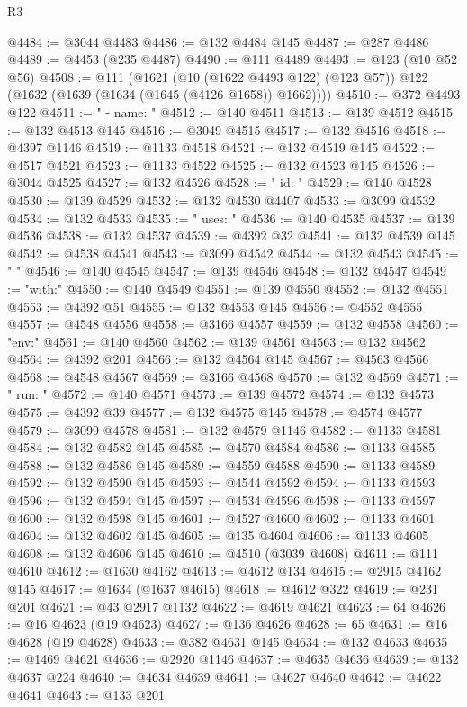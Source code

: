 \begin{lexlean}{R3}
\begin{coremodule}
@4484 := @3044 @4483
@4486 := @132 @4484 @145
@4487 := @287 @4486
@4489 := @4453 (@235 @4487)
@4490 := @111 @4489
@4493 := @123 (@10 @52 @56)
@4508 := @111
    (@1621
      (@10 (@1622 @4493 @122) (@123 @57))
      @122
      (@1632 (@1639 (@1634 (@1645 (@4126 @1658)) @1662))))
@4510 := @372 @4493 @122
@4511 := "      - name: "
@4512 := @140 @4511
@4513 := @139 @4512
@4515 := @132 @4513 @145
@4516 := @3049 @4515
@4517 := @132 @4516
@4518 := @4397 @1146
@4519 := @1133 @4518
@4521 := @132 @4519 @145
@4522 := @4517 @4521
@4523 := @1133 @4522
@4525 := @132 @4523 @145
@4526 := @3044 @4525
@4527 := @132 @4526
@4528 := "        id: "
@4529 := @140 @4528
@4530 := @139 @4529
@4532 := @132 @4530 @4407
@4533 := @3099 @4532
@4534 := @132 @4533
@4535 := "        uses: "
@4536 := @140 @4535
@4537 := @139 @4536
@4538 := @132 @4537
@4539 := @4392 @32
@4541 := @132 @4539 @145
@4542 := @4538 @4541
@4543 := @3099 @4542
@4544 := @132 @4543
@4545 := "        "
@4546 := @140 @4545
@4547 := @139 @4546
@4548 := @132 @4547
@4549 := "with:"
@4550 := @140 @4549
@4551 := @139 @4550
@4552 := @132 @4551
@4553 := @4392 @51
@4555 := @132 @4553 @145
@4556 := @4552 @4555
@4557 := @4548 @4556
@4558 := @3166 @4557
@4559 := @132 @4558
@4560 := "env:"
@4561 := @140 @4560
@4562 := @139 @4561
@4563 := @132 @4562
@4564 := @4392 @201
@4566 := @132 @4564 @145
@4567 := @4563 @4566
@4568 := @4548 @4567
@4569 := @3166 @4568
@4570 := @132 @4569
@4571 := "        run: "
@4572 := @140 @4571
@4573 := @139 @4572
@4574 := @132 @4573
@4575 := @4392 @39
@4577 := @132 @4575 @145
@4578 := @4574 @4577
@4579 := @3099 @4578
@4581 := @132 @4579 @1146
@4582 := @1133 @4581
@4584 := @132 @4582 @145
@4585 := @4570 @4584
@4586 := @1133 @4585
@4588 := @132 @4586 @145
@4589 := @4559 @4588
@4590 := @1133 @4589
@4592 := @132 @4590 @145
@4593 := @4544 @4592
@4594 := @1133 @4593
@4596 := @132 @4594 @145
@4597 := @4534 @4596
@4598 := @1133 @4597
@4600 := @132 @4598 @145
@4601 := @4527 @4600
@4602 := @1133 @4601
@4604 := @132 @4602 @145
@4605 := @135 @4604
@4606 := @1133 @4605
@4608 := @132 @4606 @145
@4610 := @4510 (@3039 @4608)
@4611 := @111 @4610
@4612 := @1630 @4162
@4613 := @4612 @134
@4615 := @2915 @4162 @145
@4617 := @1634 (@1637 @4615)
@4618 := @4612 @322
@4619 := @231 @201
@4621 := @43 @2917 @1132
@4622 := @4619 @4621
@4623 := 64
@4626 := @16 @4623 (@19 @4623)
@4627 := @136 @4626
@4628 := 65
@4631 := @16 @4628 (@19 @4628)
@4633 := @382 @4631 @145
@4634 := @132 @4633
@4635 := @1469 @4621
@4636 := @2920 @1146
@4637 := @4635 @4636
@4639 := @132 @4637 @224
@4640 := @4634 @4639
@4641 := @4627 @4640
@4642 := @4622 @4641
@4643 := @133 @201

\end{coremodule}
\end{lexlean}

